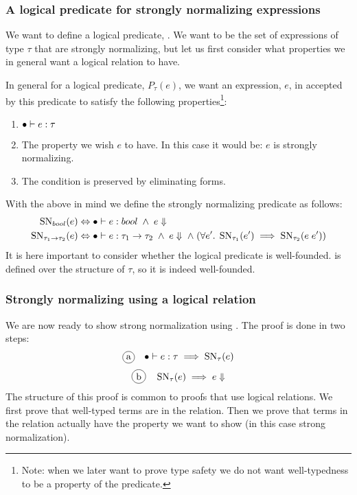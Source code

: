 \subsubsection*{A logical predicate for strongly normalizing expressions}
We want to define a logical predicate, . We want  to be the set of expressions of type $\tau$ that are strongly normalizing, but let us first consider what properties we in general want a logical relation to have.

In general for a logical predicate, $P_\tau(e)$, we want an expression, $e$, in accepted by this predicate to satisfy the following properties\footnote{Note: when we later want to prove type safety we do not want well-typedness to be a property of the predicate.}:
\begin{enumerate}
\item $\bullet \vdash e : \tau$
\item The property we wish $e$ to have. In this case it would be: $e$ is strongly normalizing.
\item The condition is preserved by eliminating forms.
\end{enumerate}
With the above in mind we define the strongly normalizing predicate as follows:
\begin{align*}
  \operatorname{SN}_{bool}(e) & \Leftrightarrow \bullet \vdash e : bool \; \wedge \; e \Downarrow \\
  \operatorname{SN}_{ \tau_1 \rightarrow \tau_2}(e) & \Leftrightarrow \bullet \vdash e :  \tau_1 \rightarrow \tau_2 \; \wedge \; e \Downarrow \; \wedge \; (\forall e'. \; \operatorname{SN}_{\tau_1}(e') \implies \operatorname{SN}_{\tau_2}(e \; e'))\\
\end{align*}
It is here important to consider whether the logical predicate is well-founded.  is defined over the structure of $\tau$, so it is indeed well-founded.
\subsubsection*{Strongly normalizing using a logical relation}
We are now ready to show strong normalization using . The proof is done in two steps:
\[
\circled{a} \quad \mtenv \vdash e : \tau \implies \SN{\tau}{e}
\]
\[
\circled{b} \quad \SN{\tau}{e} \implies e \Downarrow
\]
The structure of this proof is common to proofs that use logical relations. We first prove that well-typed terms are in the relation. Then we prove that terms in the relation actually have the property we want to show (in this case strong normalization).

